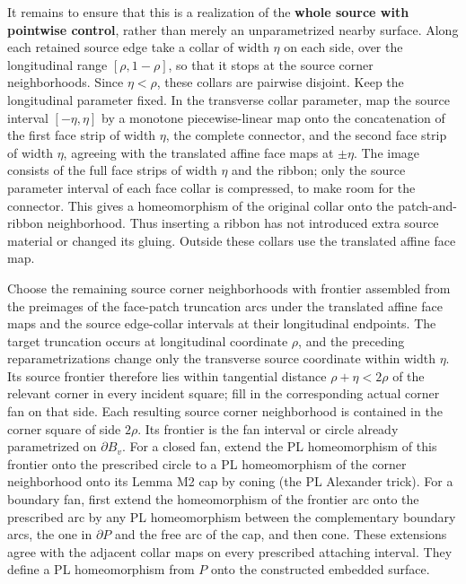 \documentclass[
  11pt,
]{article}
\begin{document}
It remains to ensure that this is a realization of the \textbf{whole
source with pointwise control}, rather than merely an unparametrized
nearby surface. Along each retained source edge take a collar of width
\(\eta\) on each side, over the longitudinal range \([\rho,1-\rho]\), so
that it stops at the source corner neighborhoods. Since \(\eta<\rho\),
these collars are pairwise disjoint. Keep the longitudinal parameter
fixed. In the transverse collar parameter, map the source interval
\([-\eta,\eta]\) by a monotone piecewise-linear map onto the
concatenation of the first face strip of width \(\eta\), the complete
connector, and the second face strip of width \(\eta\), agreeing with
the translated affine face maps at \(\pm\eta\). The image consists of
the full face strips of width \(\eta\) and the ribbon; only the source
parameter interval of each face collar is compressed, to make room for
the connector. This gives a homeomorphism of the original collar onto
the patch-and-ribbon neighborhood. Thus inserting a ribbon has not
introduced extra source material or changed its gluing. Outside these
collars use the translated affine face map.

Choose the remaining source corner neighborhoods with frontier assembled
from the preimages of the face-patch truncation arcs under the
translated affine face maps and the source edge-collar intervals at
their longitudinal endpoints. The target truncation occurs at
longitudinal coordinate \(\rho\), and the preceding reparametrizations
change only the transverse source coordinate within width \(\eta\). Its
source frontier therefore lies within tangential distance
\(\rho+\eta<2\rho\) of the relevant corner in every incident square;
fill in the corresponding actual corner fan on that side. Each resulting
source corner neighborhood is contained in the corner square of side
\(2\rho\). Its frontier is the fan interval or circle already
parametrized on \(\partial B_v\). For a closed fan, extend the PL
homeomorphism of this frontier onto the prescribed circle to a PL
homeomorphism of the corner neighborhood onto its Lemma M2 cap by coning
(the PL Alexander trick). For a boundary fan, first extend the
homeomorphism of the frontier arc onto the prescribed arc by any PL
homeomorphism between the complementary boundary arcs, the one in
\(\partial P\) and the free arc of the cap, and then cone. These
extensions agree with the adjacent collar maps on every prescribed
attaching interval. They define a PL homeomorphism from \(P\) onto the
constructed embedded surface.
\end{document}
